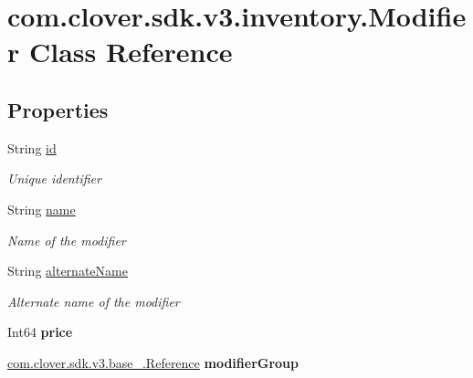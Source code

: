 \hypertarget{classcom_1_1clover_1_1sdk_1_1v3_1_1inventory_1_1_modifier}{}\section{com.\+clover.\+sdk.\+v3.\+inventory.\+Modifier Class Reference}
\label{classcom_1_1clover_1_1sdk_1_1v3_1_1inventory_1_1_modifier}
\subsection*{Properties}
\begin{DoxyCompactItemize}
\item 
String \hyperlink{classcom_1_1clover_1_1sdk_1_1v3_1_1inventory_1_1_modifier_a2733daf601464bc1b94fdaba94021cae}{id}
\begin{DoxyCompactList}\small\item\em Unique identifier \end{DoxyCompactList}\item 
String \hyperlink{classcom_1_1clover_1_1sdk_1_1v3_1_1inventory_1_1_modifier_aeaf5b7b48c942f98bc944980f8e546ea}{name}
\begin{DoxyCompactList}\small\item\em Name of the modifier \end{DoxyCompactList}\item 
String \hyperlink{classcom_1_1clover_1_1sdk_1_1v3_1_1inventory_1_1_modifier_ac60e1ea4c10282f8c9e7efa6e86abb10}{alternate\+Name}
\begin{DoxyCompactList}\small\item\em Alternate name of the modifier \end{DoxyCompactList}\item 
\mbox{\label{classcom_1_1clover_1_1sdk_1_1v3_1_1inventory_1_1_modifier_ad15cd577cfeeb0659567c1dbd799633e}} 
Int64 {\bfseries price}
\item 
\mbox{\label{classcom_1_1clover_1_1sdk_1_1v3_1_1inventory_1_1_modifier_ac27705ac187848b6e9a6ab780315302e}} 
\hyperlink{classcom_1_1clover_1_1sdk_1_1v3_1_1base___1_1_reference}{com.\+clover.\+sdk.\+v3.\+base\+\_\+.\+Reference} {\bfseries modifier\+Group}
\end{DoxyCompactItemize}


